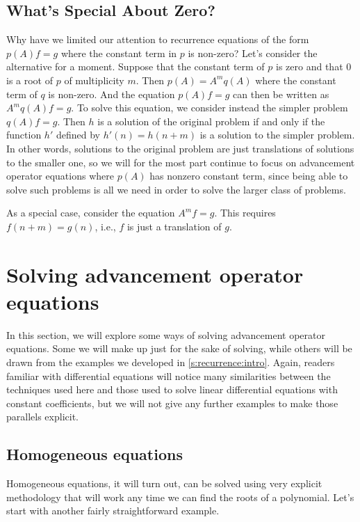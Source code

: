 \subsection{What's Special About Zero?}\label{s:recurrence:adv-ops:zero}

Why have we limited our attention to recurrence equations of the form
$p(A)f = g$ where the constant term in $p$ is non-zero?  Let's
consider the alternative for a moment.  Suppose that the constant term
of $p$ is zero and that $0$ is a root of $p$ of multiplicity $m$.
Then $p(A) = A^mq(A)$ where the constant term of $q$ is non-zero.  And
the equation $p(A)f=g$ can then be written as $A^mq(A)f=g$.  To solve
this equation, we consider instead the simpler problem $q(A)f=g$.
Then $h$ is a solution of the original problem if and only if the
function $h'$ defined by $h'(n) = h(n+m)$ is a solution to the simpler
problem.  In other words, solutions to the original problem are just
translations of solutions to the smaller one, so we will for the most
part continue to focus on advancement operator equations where $p(A)$
has nonzero constant term, since being able to solve such problems is
all we need in order to solve the larger class of problems.

As a special case, consider the equation $A^m f =g$.  This requires
$f(n+m)=g(n)$, i.e., $f$ is just a translation of $g$.

\section{Solving advancement operator
  equations}\label{s:recurrence:solving}

In this section, we will explore some ways of solving advancement
operator equations. Some we will make up just for the sake of solving,
while others will be drawn from the examples we developed in
\autoref{s:recurrence:intro}. Again, readers familiar with
differential equations will notice many similarities between the
techniques used here and those used to solve linear differential
equations with constant coefficients, but we will not give any further
examples to make those parallels explicit.

\subsection{Homogeneous equations}\label{s:recurrence:solving:homogeneous}

Homogeneous equations, it will turn out, can be solved using very
explicit methodology that will work any time we can find the roots of
a polynomial. Let's start with another fairly straightforward example.

